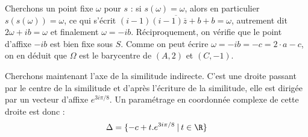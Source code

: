 {\begin{enumerate}
{Cherchons un point fixe $\omega$ pour $s$ : si $s(\omega)=\omega$, alors en particulier $s(s(\omega))=\omega$, ce qui s'écrit $(i-1)\overline{(i-1)\overline{z}+b}+b=\omega $, autrement dit $2\omega+ib = \omega$ et finalement $\omega=-ib$. Réciproquement, on vérifie que le point d'affixe $-ib$ est bien fixe sous $S$. Comme on peut écrire $\omega = -ib = -c = 2\cdot a - c$, on en déduit que $\Omega$ est le barycentre de $(A,2)$ et $(C,-1)$.

Cherchons maintenant l'axe de la similitude indirecte. C'est une droite passant par le centre de la similitude et d'après l'écriture de la similitude, elle est dirigée par un vecteur d'affixe $e^{3i\pi/8}$. Un paramétrage en coordonnée complexe de cette droite est donc :
\[\Delta = \{ -c+t.e^{3i\pi/8}\:|\: t\in \R\}
\]}
\end{enumerate}
}
